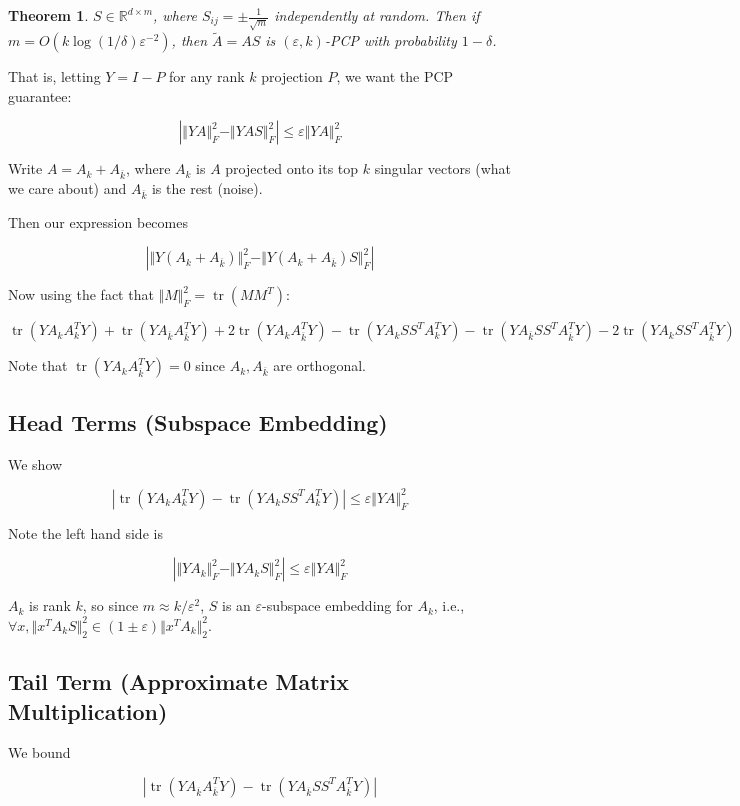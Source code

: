 \documentclass[11pt]{article}
\newcommand{\eps}{\varepsilon}
\newcommand{\R}{\mathbb{R}}
\newcommand{\Ab}{A_{\overline{k}}}
\DeclareMathOperator{\tr}{tr}
\newtheorem{theorem}{Theorem}
\begin{document}
\begin{theorem}
$S \in \R^{d \times m}$, where $S_{ij} = \pm \frac{1}{\sqrt{m}}$ independently at random. Then if $m = O(k\log (1/\delta)\eps^{-2})$, then $\tilde{A} = AS$ is $(\eps,k)$-PCP with probability $1-\delta$.
\end{theorem}

That is, letting $Y = I - P$ for any rank $k$ projection $P$, we want the PCP guarantee:

\[
|\Vert YA \Vert_F^2 - \Vert YAS \Vert_F^2 | \leq \eps \Vert YA \Vert_F^2
\]

Write $A = A_k + \Ab$, where $A_k$ is $A$ projected onto its top $k$ singular vectors (what we care about) and $\Ab$ is the rest (noise).

Then our expression becomes

\[
| \Vert Y (A_k + \Ab) \Vert_F^2 - \Vert Y (A_k + \Ab)S \Vert_F^2 |
\]

Now using the fact that $\Vert M \Vert_F^2 = \tr(MM^T)$:

\[
\tr(Y A_k A_k^T Y) + \tr(Y \Ab \Ab^T Y) + 2\tr(Y A_k \Ab^T Y) - \tr(Y A_k SS^T A_k^T Y) - \tr(Y\Ab SS^T \Ab^T Y) - 2\tr(YA_k SS^T \Ab^T Y)
\]

Note that $\tr(Y A_k \Ab^T Y) = 0$ since $A_k,\Ab$ are orthogonal.

\subsection{Head Terms (Subspace Embedding)}

We show

\[
| \tr(Y A_k A_k^T Y) - \tr(Y A_k SS^T A_k^T Y) | \leq \eps \Vert Y A \Vert_F^2
\]

Note the left hand side is

\[
| \Vert Y A_k \Vert_F^2 - \Vert Y A_k S \Vert_F^2 | \leq \eps \Vert Y A \Vert_F^2
\]

$A_k$ is rank $k$, so since $m \approx k/\eps^2$, $S$ is an $\eps$-subspace embedding for $A_k$, i.e., $\forall x, \Vert x^T A_k S \Vert_2^2 \in (1 \pm \eps) \Vert x^T A_k \Vert_2^2$.

\subsection{Tail Term (Approximate Matrix Multiplication)}

We bound

\[
| \tr(Y \Ab \Ab^T Y) - \tr(Y \Ab SS^T \Ab^T Y) |
\]
\end{document}
